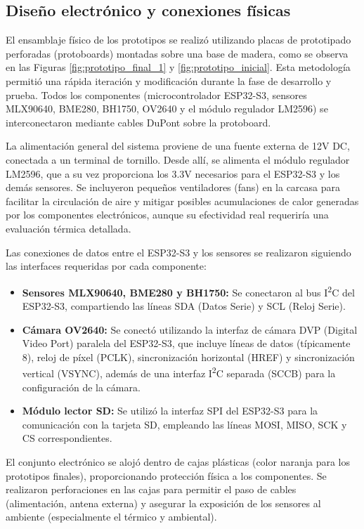 \subsection{Diseño electrónico y conexiones físicas}
\label{subsec:hardware_diseno_electronico}
El ensamblaje físico de los prototipos se realizó utilizando placas de prototipado perforadas (protoboards) montadas sobre una base de madera, como se observa en las Figuras \ref{fig:prototipo_final_1} y \ref{fig:prototipo_inicial}. Esta metodología permitió una rápida iteración y modificación durante la fase de desarrollo y prueba. Todos los componentes (microcontrolador ESP32-S3, sensores MLX90640, BME280, BH1750, OV2640 y el módulo regulador LM2596) se interconectaron mediante cables DuPont sobre la protoboard.

La alimentación general del sistema proviene de una fuente externa de 12V DC, conectada a un terminal de tornillo. Desde allí, se alimenta el módulo regulador LM2596, que a su vez proporciona los 3.3V necesarios para el ESP32-S3 y los demás sensores. Se incluyeron pequeños ventiladores (fans) en la carcasa para facilitar la circulación de aire y mitigar posibles acumulaciones de calor generadas por los componentes electrónicos, aunque su efectividad real requeriría una evaluación térmica detallada.

Las conexiones de datos entre el ESP32-S3 y los sensores se realizaron siguiendo las interfaces requeridas por cada componente:
\begin{itemize}
    \item \textbf{Sensores MLX90640, BME280 y BH1750:} Se conectaron al bus I\textsuperscript{2}C del ESP32-S3, compartiendo las líneas SDA (Datos Serie) y SCL (Reloj Serie).
    \item \textbf{Cámara OV2640:} Se conectó utilizando la interfaz de cámara DVP (Digital Video Port) paralela del ESP32-S3, que incluye líneas de datos (típicamente 8), reloj de píxel (PCLK), sincronización horizontal (HREF) y sincronización vertical (VSYNC), además de una interfaz I\textsuperscript{2}C separada (SCCB) para la configuración de la cámara.
    \item \textbf{Módulo lector SD:} Se utilizó la interfaz SPI del ESP32-S3 para la comunicación con la tarjeta SD, empleando las líneas MOSI, MISO, SCK y CS correspondientes.
\end{itemize}
El conjunto electrónico se alojó dentro de cajas plásticas (color naranja para los prototipos finales), proporcionando protección física a los componentes. Se realizaron perforaciones en las cajas para permitir el paso de cables (alimentación, antena externa) y asegurar la exposición de los sensores al ambiente (especialmente el térmico y ambiental).

